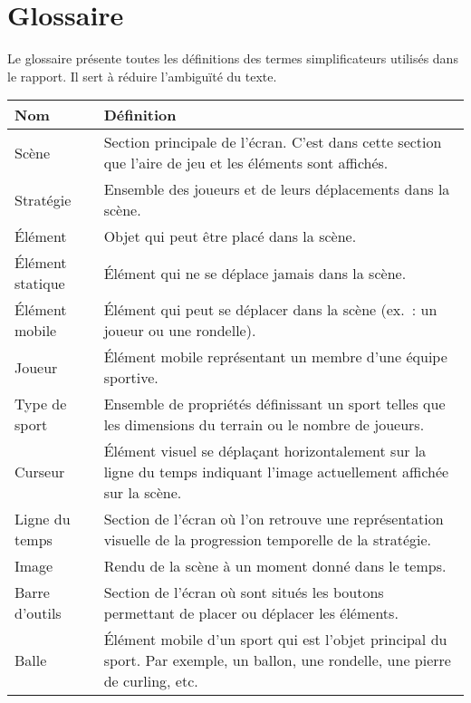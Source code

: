 \chapter{Glossaire}
\label{s:glossaire}

Le glossaire présente toutes les définitions des termes simplificateurs utilisés dans le rapport. Il sert à réduire l'ambiguïté du texte.\\

{\def\arraystretch{1.5}\tabcolsep=5pt
\begin{tabularx}{\textwidth}{|l|X|}
	\hline
	Nom & Définition \\
	\hline
	Scène 				& Section principale de l'écran. C'est dans cette section que l'aire de jeu et les éléments sont affichés. \\
	Stratégie  			& Ensemble des joueurs et de leurs déplacements dans la scène. \\
	Élément 			& Objet qui peut être placé dans la scène. \\
	Élément statique 	& Élément qui ne se déplace jamais dans la scène. \\
	Élément mobile 		& Élément qui peut se déplacer dans la scène (ex.~: un joueur ou une rondelle). \\
	Joueur				& Élément mobile représentant un membre d'une équipe sportive. \\
	Type de sport		& Ensemble de propriétés définissant un sport telles que les dimensions du terrain ou le nombre de joueurs. \\
	Curseur 			& Élément visuel se déplaçant horizontalement sur la ligne du temps indiquant l'image actuellement affichée sur la scène. \\
	Ligne du temps 		& Section de l'écran où l'on retrouve une représentation visuelle de la progression temporelle de la stratégie. \\
	Image				& Rendu de la scène à un moment donné dans le temps. \\
	Barre d'outils 		& Section de l'écran où sont situés les boutons permettant de placer ou déplacer les éléments. \\
	Balle               & Élément mobile d'un sport qui est l'objet principal du sport. Par exemple, un ballon, une rondelle, une pierre de curling, etc. \\
	\hline
\end{tabularx}
}